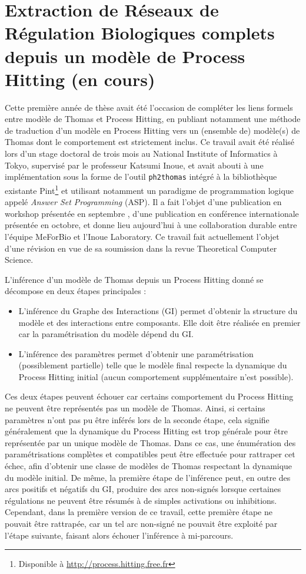 \section{Extraction de Réseaux de Régulation Biologiques complets depuis un modèle de Process Hitting \normalsize(en cours)}
\label{sec:tcs}

Cette première année de thèse avait été l'occasion de compléter les liens formels entre modèle de Thomas et Process Hitting,
en publiant notamment une méthode de traduction d'un modèle en Process Hitting vers un (ensemble de) modèle(s) de Thomas dont le comportement est strictement inclus.
Ce travail avait été réalisé lors d'un stage doctoral de trois mois au National Institute of Informatics à Tokyo, supervisé par le professeur Katsumi Inoue, et avait abouti à une implémentation sous la forme de l'outil \texttt{ph2thomas} intégré à la bibliothèque existante Pint\footnote{Disponible à \url{http://process.hitting.free.fr}} et utilisant notamment un paradigme de programmation logique appelé \emph{Answer Set Programming} (ASP).
Il a fait l'objet d'une publication en workshop présentée en septembre \cite{FPIMR12-LDSSB}, d'une publication en conférence internationale \cite{FPIMR12-CMSB} présentée en octobre, et donne lieu aujourd'hui à une collaboration durable entre l'équipe MeForBio et l'Inoue Laboratory.
Ce travail fait actuellement l'objet d'une révision en vue de sa soumission dans la revue Theoretical Computer Science.

L'inférence d'un modèle de Thomas depuis un Process Hitting donné se décompose en deux étapes principales :
\begin{itemize}
  \item L'inférence du Graphe des Interactions (GI) permet d'obtenir la structure du modèle et des interactions entre composants.
  Elle doit être réalisée en premier car la paramétrisation du modèle dépend du GI.
  \item L'inférence des paramètres permet d'obtenir une paramétrisation (possiblement partielle) telle que le modèle final respecte la dynamique du Process Hitting initial (aucun comportement supplémentaire n'est possible).
\end{itemize}
Ces deux étapes peuvent échouer car certains comportement du Process Hitting ne peuvent être représentés pas un modèle de Thomas.
Ainsi, si certains paramètres n'ont pas pu être inférés lors de la seconde étape, cela signifie généralement que la dynamique du Process Hitting est trop générale pour être représentée par un unique modèle de Thomas.
Dans ce cas, une énumération des paramétrisations complètes et compatibles peut être effectuée pour rattraper cet échec, afin d'obtenir une classe de modèles de Thomas respectant la dynamique du modèle initial.
De même, la première étape de l'inférence peut, en outre des arcs positifs et négatifs du GI, produire des arcs non-signés lorsque certaines régulations ne peuvent être résumés à de simples activations ou inhibitions.
Cependant, dans la première version de ce travail, cette première étape ne pouvait être rattrapée,
car un tel arc non-signé ne pouvait être exploité par l'étape suivante, faisant alors échouer l'inférence à mi-parcours.

